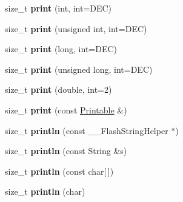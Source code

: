 \begin{DoxyCompactItemize}
\item 
\hypertarget{class_print_ad485be2c2a9bd124789a58e41533bec3}{size\-\_\-t {\bfseries print} (int, int=D\-E\-C)}\label{class_print_ad485be2c2a9bd124789a58e41533bec3}

\item 
\hypertarget{class_print_a5162c987fb51e1f223b92af3ed436d9c}{size\-\_\-t {\bfseries print} (unsigned int, int=D\-E\-C)}\label{class_print_a5162c987fb51e1f223b92af3ed436d9c}

\item 
\hypertarget{class_print_a447df1d390c7dc8af70f7e684963b212}{size\-\_\-t {\bfseries print} (long, int=D\-E\-C)}\label{class_print_a447df1d390c7dc8af70f7e684963b212}

\item 
\hypertarget{class_print_ae3b005981b3f34d0f352632204a52edf}{size\-\_\-t {\bfseries print} (unsigned long, int=D\-E\-C)}\label{class_print_ae3b005981b3f34d0f352632204a52edf}

\item 
\hypertarget{class_print_aa538defb056f77e8664a6ef29d281a8c}{size\-\_\-t {\bfseries print} (double, int=2)}\label{class_print_aa538defb056f77e8664a6ef29d281a8c}

\item 
\hypertarget{class_print_a922b3bb2a3e42c1b0c5b1d62b3a8fb3f}{size\-\_\-t {\bfseries print} (const \hyperlink{class_printable}{Printable} \&)}\label{class_print_a922b3bb2a3e42c1b0c5b1d62b3a8fb3f}

\item 
\hypertarget{class_print_a36d02f29121121bca22cd51d468dfa9e}{size\-\_\-t {\bfseries println} (const \-\_\-\-\_\-\-Flash\-String\-Helper $\ast$)}\label{class_print_a36d02f29121121bca22cd51d468dfa9e}

\item 
\hypertarget{class_print_a44007d63e31bec0bd3854eab1796c53d}{size\-\_\-t {\bfseries println} (const String \&s)}\label{class_print_a44007d63e31bec0bd3854eab1796c53d}

\item 
\hypertarget{class_print_abf944a191b3d93d87782824496fc9856}{size\-\_\-t {\bfseries println} (const char\mbox{[}$\,$\mbox{]})}\label{class_print_abf944a191b3d93d87782824496fc9856}

\item 
\hypertarget{class_print_a6067829b7b76b5a541039c12ae1a9f7d}{size\-\_\-t {\bfseries println} (char)}\label{class_print_a6067829b7b76b5a541039c12ae1a9f7d}


\end{DoxyCompactItemize}
